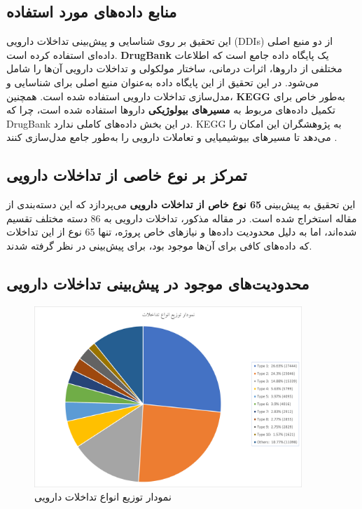 \subsection{منابع داده‌های مورد استفاده}
این تحقیق بر روی شناسایی و پیش‌بینی تداخلات دارویی (DDIs) از دو منبع اصلی داده‌ای استفاده کرده است. \textbf{DrugBank} یک پایگاه داده جامع است که اطلاعات مختلفی از داروها، اثرات درمانی، ساختار مولکولی و تداخلات دارویی آن‌ها را شامل می‌شود. در این تحقیق از این پایگاه داده به‌عنوان منبع اصلی برای شناسایی و مدل‌سازی تداخلات دارویی استفاده شده است. همچنین، \textbf{KEGG} به‌طور خاص برای تکمیل داده‌های مربوط به \textbf{مسیرهای بیولوژیکی} داروها استفاده شده است، چرا که DrugBank در این بخش داده‌های کاملی ندارد. KEGG به پژوهشگران این امکان را می‌دهد تا مسیرهای بیوشیمیایی و تعاملات دارویی را به‌طور جامع مدل‌سازی کنند \cite{ref_kegg, ref_drugbank}.

\subsection{تمرکز بر نوع خاصی از تداخلات دارویی}
این تحقیق به پیش‌بینی \textbf{65 نوع خاص از تداخلات دارویی} می‌پردازد که این دسته‌بندی از مقاله \cite{ref_ryu2018} استخراج شده‌ است. در مقاله مذکور، تداخلات دارویی به 86 دسته مختلف تقسیم شده‌اند، اما به دلیل محدودیت داده‌ها و نیازهای خاص پروژه، تنها 65 نوع از این تداخلات که داده‌های کافی برای آن‌ها موجود بود، برای پیش‌بینی در نظر گرفته شدند.

\subsection{محدودیت‌های موجود در پیش‌بینی تداخلات دارویی}

\begin{figure}[t]
	\centering
	\includegraphics[width=0.9\textwidth]{images/image1-1.png}
	\caption{ نمودار توزیع انواع تداخلات دارویی }
	\label{image1-1}
	\centering
\end{figure}

